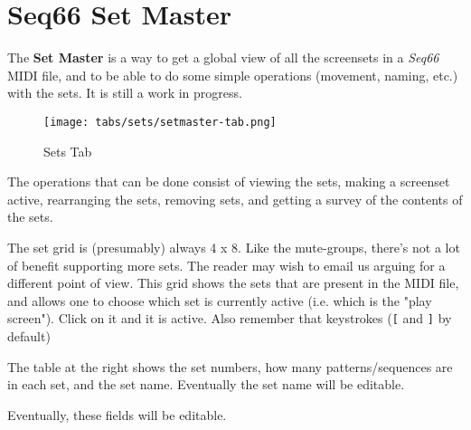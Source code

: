 %
%
%

\section{Seq66 Set Master}
\label{sec:setmaster}

   The \textbf{Set Master} is a way to get a global view of all the screensets in
   a \textsl{Seq66} MIDI file, and to be able to do some simple operations
   (movement, naming, etc.) with the sets.  It is still a work in progress.

\begin{figure}[H]
   \centering 
   \texttt{[image: tabs/sets/setmaster-tab.png]}
   \caption{Sets Tab}
   \label{fig:setmaster_tab}
\end{figure}

   The operations that can be done consist of viewing the sets, making a
   screenset active, rearranging the sets, removing sets, and getting a survey of
   the contents of the sets.

   \setcounter{ItemCounter}{0}      %

   The set grid is (presumably) always 4 x 8.  Like the mute-groups, there's not
   a lot of benefit supporting more sets.  The reader may wish to email us
   arguing for a different point of view.
   This grid shows the sets that are
   present in the MIDI file, and allows one to choose which set is currently
   active (i.e. which is the "play screen").
   Click on it and it is active.
   Also remember that keystrokes (\texttt{[} and \texttt{]} by default)
 
   The table at the right shows the set numbers, how many patterns/sequences are
   in each set, and the set name.  Eventually the set name will be editable.

   Eventually, these fields will be editable.

